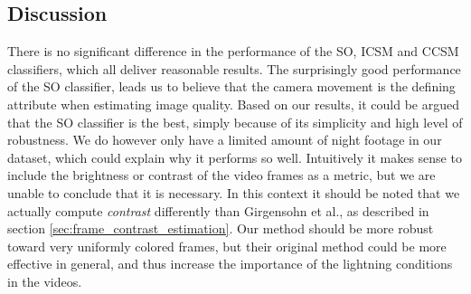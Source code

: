 \subsection{Discussion}\label{sec:phase1discussion}
%
There is no significant difference in the performance of the SO, ICSM and CCSM classifiers, which all deliver reasonable results. The surprisingly good performance of the SO classifier, leads us to believe that the camera movement is the defining attribute when estimating image quality. Based on our results, it could be argued that the SO classifier is the best, simply because of its simplicity and high level of robustness. We do however only have a limited amount of night footage in our dataset, which could explain why it performs so well. Intuitively it makes sense to include the brightness or contrast of the video frames as a metric, but we are unable to conclude that it is necessary. In this context it should be noted that we actually compute \textit{contrast} differently than Girgensohn et al.\cite{Girgensohn:2000:SAH:354401.354415}, as described in section \ref{sec:frame_contrast_estimation}. Our method should be more robust toward very uniformly colored frames, but their original method could be more effective in general, and thus increase the importance of the lightning conditions in the videos.
%
